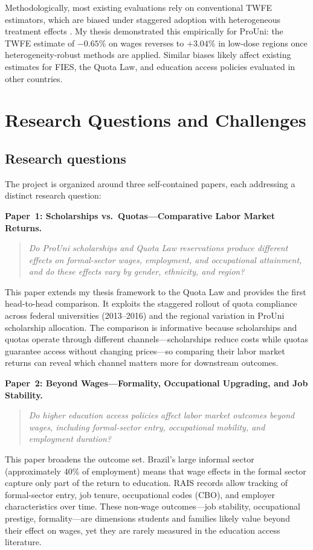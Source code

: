 \documentclass[a4paper,11pt]{article}
\begin{document}
Methodologically, most existing evaluations rely on conventional TWFE estimators, which are biased under staggered adoption with heterogeneous treatment effects \citep{goodmanbacon2021, dechaisemartin2020}. My thesis demonstrated this empirically for ProUni: the TWFE estimate of $-0.65\%$ on wages reverses to $+3.04\%$ in low-dose regions once heterogeneity-robust methods are applied. Similar biases likely affect existing estimates for FIES, the Quota Law, and education access policies evaluated in other countries.

\section{Research Questions and Challenges}

\subsection{Research questions}

The project is organized around three self-contained papers, each addressing a distinct research question:

\textbf{Paper~1: Scholarships vs.\ Quotas---Comparative Labor Market Returns.}
\begin{quote}
\textit{Do ProUni scholarships and Quota Law reservations produce different effects on formal-sector wages, employment, and occupational attainment, and do these effects vary by gender, ethnicity, and region?}
\end{quote}
This paper extends my thesis framework to the Quota Law and provides the first head-to-head comparison. It exploits the staggered rollout of quota compliance across federal universities (2013--2016) and the regional variation in ProUni scholarship allocation. The comparison is informative because scholarships and quotas operate through different channels---scholarships reduce costs while quotas guarantee access without changing prices---so comparing their labor market returns can reveal which channel matters more for downstream outcomes.

\textbf{Paper~2: Beyond Wages---Formality, Occupational Upgrading, and Job Stability.}
\begin{quote}
\textit{Do higher education access policies affect labor market outcomes beyond wages, including formal-sector entry, occupational mobility, and employment duration?}
\end{quote}
This paper broadens the outcome set. Brazil's large informal sector (approximately 40\% of employment) means that wage effects in the formal sector capture only part of the return to education. RAIS records allow tracking of formal-sector entry, job tenure, occupational codes (CBO), and employer characteristics over time. These non-wage outcomes---job stability, occupational prestige, formality---are dimensions students and families likely value beyond their effect on wages, yet they are rarely measured in the education access literature.
\end{document}
